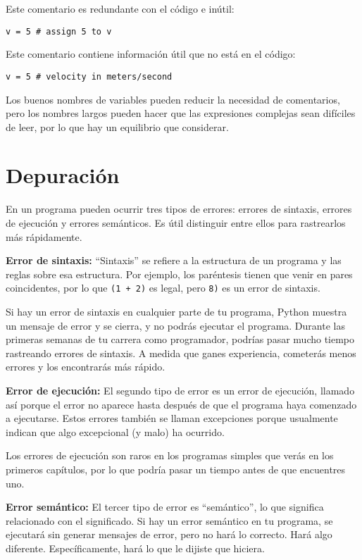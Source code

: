 \documentclass[12pt,letterpaper]{book}
\begin{document}
Este comentario es redundante con el código e inútil:

\begin{lstlisting}
v = 5 # assign 5 to v
\end{lstlisting}

Este comentario contiene información útil que no está en el código:

\begin{lstlisting}
v = 5 # velocity in meters/second
\end{lstlisting}

Los buenos nombres de variables pueden reducir la necesidad de comentarios, pero los nombres largos pueden hacer que las expresiones complejas sean difíciles de leer, por lo que hay un equilibrio que considerar.

\section{Depuración}

En un programa pueden ocurrir tres tipos de errores: errores de sintaxis, errores de ejecución y errores semánticos. Es útil distinguir entre ellos para rastrearlos más rápidamente.

\textbf{Error de sintaxis:} ``Sintaxis'' se refiere a la estructura de un programa y las reglas sobre esa estructura. Por ejemplo, los paréntesis tienen que venir en pares coincidentes, por lo que \texttt{(1 + 2)} es legal, pero \texttt{8)} es un error de sintaxis.

Si hay un error de sintaxis en cualquier parte de tu programa, Python muestra un mensaje de error y se cierra, y no podrás ejecutar el programa. Durante las primeras semanas de tu carrera como programador, podrías pasar mucho tiempo rastreando errores de sintaxis. A medida que ganes experiencia, cometerás menos errores y los encontrarás más rápido.

\textbf{Error de ejecución:} El segundo tipo de error es un error de ejecución, llamado así porque el error no aparece hasta después de que el programa haya comenzado a ejecutarse. Estos errores también se llaman excepciones porque usualmente indican que algo excepcional (y malo) ha ocurrido.

Los errores de ejecución son raros en los programas simples que verás en los primeros capítulos, por lo que podría pasar un tiempo antes de que encuentres uno.

\textbf{Error semántico:} El tercer tipo de error es ``semántico'', lo que significa relacionado con el significado. Si hay un error semántico en tu programa, se ejecutará sin generar mensajes de error, pero no hará lo correcto. Hará algo diferente. Específicamente, hará lo que le dijiste que hiciera.
\end{document}
